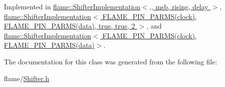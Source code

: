 Implemented in \hyperlink{classflame_1_1_shifter_implementation_aa380a270ea9d3b40da868822daf9022e}{flame\-::\-Shifter\-Implementation$<$,, msb, rising, delay $>$}, \hyperlink{classflame_1_1_shifter_implementation_aa380a270ea9d3b40da868822daf9022e}{flame\-::\-Shifter\-Implementation$<$ F\-L\-A\-M\-E\-\_\-\-P\-I\-N\-\_\-\-P\-A\-R\-M\-S(clock), F\-L\-A\-M\-E\-\_\-\-P\-I\-N\-\_\-\-P\-A\-R\-M\-S(data), true, true, 2 $>$}, and \hyperlink{classflame_1_1_shifter_implementation_aa380a270ea9d3b40da868822daf9022e}{flame\-::\-Shifter\-Implementation$<$ F\-L\-A\-M\-E\-\_\-\-P\-I\-N\-\_\-\-P\-A\-R\-M\-S(clock), F\-L\-A\-M\-E\-\_\-\-P\-I\-N\-\_\-\-P\-A\-R\-M\-S(data)$>$}.



The documentation for this class was generated from the following file\-:\begin{DoxyCompactItemize}
\item 
flame/\hyperlink{_shifter_8h}{Shifter.\-h}\end{DoxyCompactItemize}
